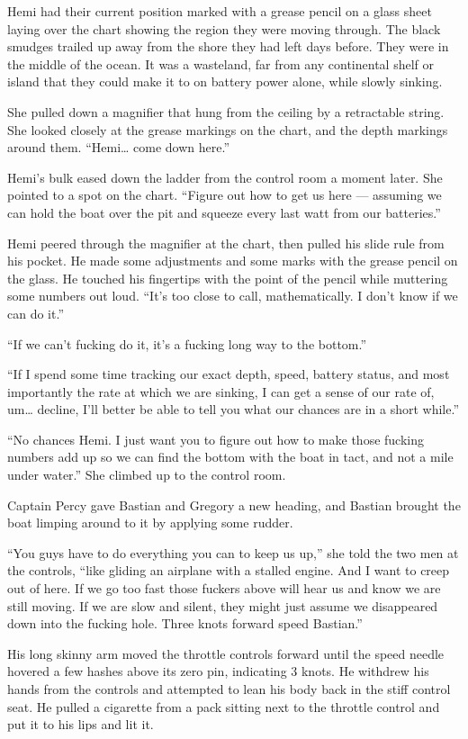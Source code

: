 \documentclass[
]{scrbook}
\begin{document}
Hemi had their current position marked with a grease pencil on a glass
sheet laying over the chart showing the region they were moving through.
The black smudges trailed up away from the shore they had left days
before. They were in the middle of the ocean. It was a wasteland, far
from any continental shelf or island that they could make it to on
battery power alone, while slowly sinking.

She pulled down a magnifier that hung from the ceiling by a retractable
string. She looked closely at the grease markings on the chart, and the
depth markings around them. ``Hemi\ldots{} come down here.''

Hemi's bulk eased down the ladder from the control room a moment later.
She pointed to a spot on the chart. ``Figure out how to get us here ---
assuming we can hold the boat over the pit and squeeze every last watt
from our batteries.''

Hemi peered through the magnifier at the chart, then pulled his slide
rule from his pocket. He made some adjustments and some marks with the
grease pencil on the glass. He touched his fingertips with the point of
the pencil while muttering some numbers out loud. ``It's too close to
call, mathematically. I don't know if we can do it.''

``If we can't fucking do it, it's a fucking long way to the bottom.''

``If I spend some time tracking our exact depth, speed, battery status,
and most importantly the rate at which we are sinking, I can get a sense
of our rate of, um\ldots{} decline, I'll better be able to tell you what
our chances are in a short while.''

``No chances Hemi. I just want you to figure out how to make those
fucking numbers add up so we can find the bottom with the boat in tact,
and not a mile under water.'' She climbed up to the control room.

Captain Percy gave Bastian and Gregory a new heading, and Bastian
brought the boat limping around to it by applying some rudder.

``You guys have to do everything you can to keep us up,'' she told the
two men at the controls, ``like gliding an airplane with a stalled
engine. And I want to creep out of here. If we go too fast those fuckers
above will hear us and know we are still moving. If we are slow and
silent, they might just assume we disappeared down into the fucking
hole. Three knots forward speed Bastian.''

His long skinny arm moved the throttle controls forward until the speed
needle hovered a few hashes above its zero pin, indicating 3 knots. He
withdrew his hands from the controls and attempted to lean his body back
in the stiff control seat. He pulled a cigarette from a pack sitting
next to the throttle control and put it to his lips and lit it.
\end{document}
